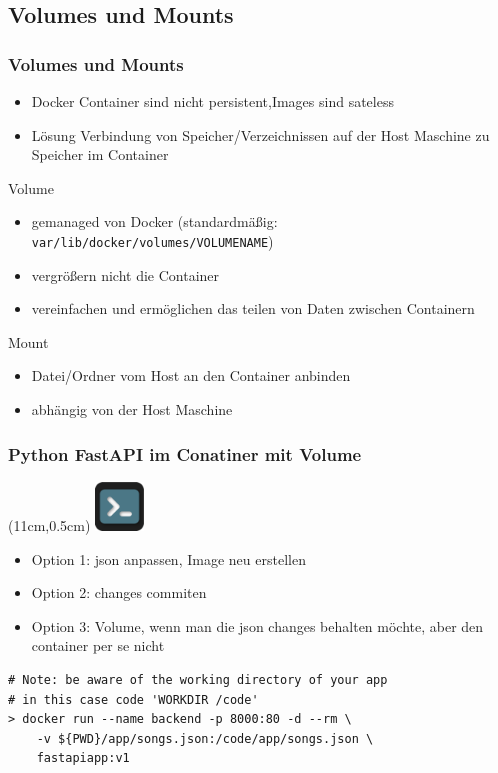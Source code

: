 \documentclass[22pt]{beamer}
\newcommand{\code}[1]{\colorbox{darkgray!20}{\texttt{#1}}}
\newcommand{\terminal}{
    \begin{textblock*}{1.3cm}(11cm,0.5cm) %
    \includegraphics[width=1.3cm]{Bilder/terminal2.png}
    \end{textblock*}
}
\begin{document}
\subsection{Volumes und Mounts}
\begin{frame}[t]
    \frametitle{Volumes und Mounts}
    \begin{itemize}
        \item Docker Container sind nicht persistent,Images sind sateless
        \item Lösung Verbindung von Speicher/Verzeichnissen auf der Host Maschine zu Speicher im Container
    \end{itemize} \pause
    \begin{block}{Volume}
        \begin{itemize}
            \item gemanaged von Docker (standardmäßig: \code{var/lib/docker/volumes/VOLUMENAME})
            \item vergrößern nicht die Container
            \item vereinfachen und ermöglichen das teilen von Daten zwischen Containern
        \end{itemize}
    \end{block} \pause
    \begin{block}{Mount}
        \begin{itemize}
            \item Datei/Ordner vom Host an den Container anbinden
            \item abhängig von der Host Maschine
        \end{itemize}
    \end{block}
\end{frame}

\begin{frame}[fragile]
    \frametitle{Python FastAPI im Conatiner mit Volume}
    \terminal
    \begin{itemize}
        \item Option 1: json anpassen, Image neu erstellen
        \item Option 2: changes commiten
        \item Option 3: Volume, wenn man die json changes behalten möchte, aber den container per se nicht
    \end{itemize}
\vspace{0.8cm}
\begin{verbatim}
# Note: be aware of the working directory of your app
# in this case code 'WORKDIR /code'
> docker run --name backend -p 8000:80 -d --rm \
    -v ${PWD}/app/songs.json:/code/app/songs.json \
    fastapiapp:v1
\end{verbatim}
            
\end{frame}
\end{document}
